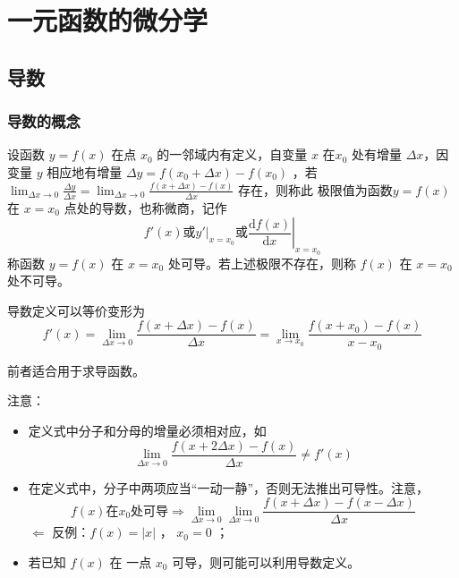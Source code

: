 \chapter{一元函数的微分学}

\section{导数}

\subsection{导数的概念}

\begin{Def}[导数]

    设函数 $ y=f(x) $ 在点 $ x_{0} $ 的一邻域内有定义，自变量 $ x $ 在$ x_0 $ 处有增量 $ \Delta x $，因变量 $ y $ 
    相应地有增量 $ \Delta y=f(x_0+\Delta x)-f(x_0) $ ，若 
    $ {\displaystyle\lim_{\Delta x\rightarrow 0}}\frac{\Delta y}{\Delta x}=
    {\displaystyle\lim_{\Delta x\rightarrow 0}}\frac{f(x+\Delta x)-f(x)}{\Delta x} $ 存在，则称此
    极限值为函数$ y=f(x) $ 在 $ x=x_0 $ 点处的导数，也称微商，记作$$
        f'(x)\textrm{或}\left.y'\right|_{x=x_0}\textrm{或}\left.\frac{\mathrm{d}f(x)}{\mathrm{d}x}\right|_{x=x_0}
    $$ 
    称函数 $ y=f(x) $ 在 $ x=x_0 $ 处可导。若上述极限不存在，则称 $ f(x) $ 在 $ x=x_0 $ 处不可导。 
\end{Def}

\begin{Field}[导数定义的等价变形]

    导数定义可以等价变形为
    $$
        f'(x)={\displaystyle\lim_{\Delta x\rightarrow 0}}\frac{f(x+\Delta x)-f(x)}{\Delta x}=
        {\displaystyle\lim_{x\rightarrow x_0}} \frac{f(x+x_0)-f(x)}{x-x_0}
    $$ 
\end{Field}
前者适合用于求导函数。

注意：
\begin{itemize}
    \item 定义式中分子和分母的增量必须相对应，如$$
        {\displaystyle\lim_{\Delta x\rightarrow 0}\frac{f(x+2\Delta x)-f(x)}{\Delta x}}\neq f'(x)
    $$ 
    \item 在定义式中，分子中两项应当“一动一静”，否则无法推出可导性。注意，$$
        f(x)\textrm{在}x_0\textrm{处可导}\Rightarrow {\displaystyle\lim_{\Delta x\rightarrow 0}}
        {\displaystyle\lim_{\Delta x\rightarrow 0}}\frac{f(x+\Delta x)-f(x-\Delta x)}{\Delta x}
    $$ 
    $ \Leftarrow $ 反例：$ f(x)=|x| $ ， $ x_0 = 0 $ ；
    \item 若已知 $ f(x) $ 在 一点 $ x_0 $ 可导，则可能可以利用导数定义。
\end{itemize}

